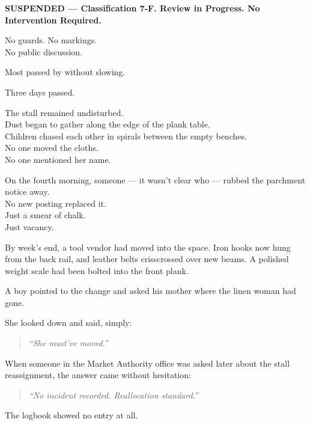\documentclass[12pt]{article}
\begin{document}
\begin{center}
\textbf{SUSPENDED --- Classification 7-F. Review in Progress. No Intervention Required.}
\end{center}

No guards. No markings.\\
No public discussion.

Most passed by without slowing.

\vspace{1em}

Three days passed.

The stall remained undisturbed.\\
Dust began to gather along the edge of the plank table.\\
Children chased each other in spirals between the empty benches.\\
No one moved the cloths.\\
No one mentioned her name.

On the fourth morning, someone --- it wasn’t clear who --- rubbed the parchment notice away.\\
No new posting replaced it.\\
Just a smear of chalk.\\
Just vacancy.

\vspace{1em}

By week’s end, a tool vendor had moved into the space. Iron hooks now hung from the back rail, and leather belts crisscrossed over new beams. A polished weight scale had been bolted into the front plank.

A boy pointed to the change and asked his mother where the linen woman had gone.

She looked down and said, simply:

\begin{quote}
\textit{“She must’ve moved.”}
\end{quote}

\vspace{1em}

When someone in the Market Authority office was asked later about the stall reassignment, the answer came without hesitation:

\begin{quote}
\textit{“No incident recorded. Reallocation standard.”}
\end{quote}

The logbook showed no entry at all.

\dotfill
\end{document}
